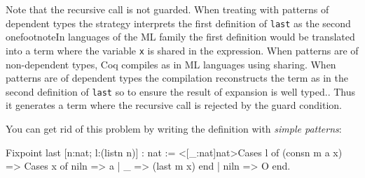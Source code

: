 \begin{itemize}
Note that the recursive call   is not
guarded. When treating with patterns of dependent types the strategy
interprets the first definition of \texttt{last} as the second
onefootnote{In languages of the ML family
the first definition would be translated into a term where the
variable \texttt{x} is shared in the expression.  When
patterns are of non-dependent types, Coq compiles as in ML languages
using sharing. When patterns are of dependent types the compilation
reconstructs the term as in the second definition of \texttt{last} so to
ensure the result of expansion is well typed.}.
Thus it generates a
term where the recursive call is rejected by the 
guard condition.

You can get rid of this problem by writing the definition with \emph{simple
patterns}:

\begin{coq_example}
Fixpoint last [n:nat; l:(listn n)] : nat :=
<[_:nat]nat>Cases l of
    (consn m a x) => Cases x of
                         niln => a
                     |   _    => (last m x)
                     end
 |   niln         => O
 end.
\end{coq_example}


\end{itemize}

%

